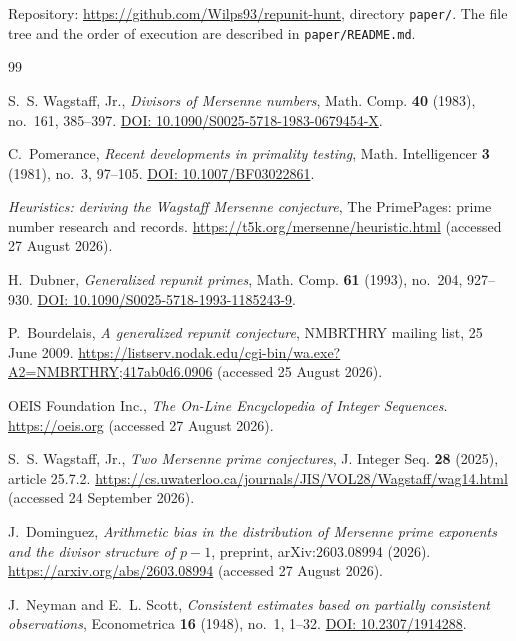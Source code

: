 \documentclass[11pt,a4paper]{article}
\theoremstyle{plain}
\theoremstyle{remark}
\begin{document}
Repository: \url{https://github.com/Wilps93/repunit-hunt}, directory
\texttt{paper/}. The file tree and the order of execution are described in
\texttt{paper/README.md}.

\begin{thebibliography}{99}

 S.~S. Wagstaff, Jr., \emph{Divisors of Mersenne
numbers}, Math. Comp. \textbf{40} (1983), no.~161, 385--397.
\href{https://doi.org/10.1090/S0025-5718-1983-0679454-X}{DOI:
10.1090/S0025-5718-1983-0679454-X}.

 C.~Pomerance, \emph{Recent developments in primality
testing}, Math. Intelligencer \textbf{3} (1981), no.~3, 97--105.
\href{https://doi.org/10.1007/BF03022861}{DOI: 10.1007/BF03022861}.

 \emph{Heuristics: deriving the Wagstaff Mersenne conjecture}, The
PrimePages: prime number research and records.
\url{https://t5k.org/mersenne/heuristic.html} (accessed 27 August 2026).

 H.~Dubner, \emph{Generalized repunit primes}, Math. Comp.
\textbf{61} (1993), no.~204, 927--930.
\href{https://doi.org/10.1090/S0025-5718-1993-1185243-9}{DOI:
10.1090/S0025-5718-1993-1185243-9}.

 P.~Bourdelais, \emph{A generalized repunit
conjecture}, NMBRTHRY mailing list, 25 June 2009.
\url{https://listserv.nodak.edu/cgi-bin/wa.exe?A2=NMBRTHRY;417ab0d6.0906}
(accessed 25 August 2026).

 OEIS Foundation Inc., \emph{The On-Line Encyclopedia of Integer
Sequences}. \url{https://oeis.org} (accessed 27 August 2026).

 S.~S. Wagstaff, Jr., \emph{Two Mersenne prime
conjectures}, J. Integer Seq. \textbf{28} (2025), article 25.7.2.
\url{https://cs.uwaterloo.ca/journals/JIS/VOL28/Wagstaff/wag14.html}
(accessed 24 September 2026).

 J.~Dominguez, \emph{Arithmetic bias in the distribution
of Mersenne prime exponents and the divisor structure of $p-1$}, preprint,
arXiv:2603.08994 (2026). \url{https://arxiv.org/abs/2603.08994}
(accessed 27 August 2026).

 J.~Neyman and E.~L. Scott, \emph{Consistent estimates
based on partially consistent observations}, Econometrica \textbf{16} (1948),
no.~1, 1--32.
\href{https://doi.org/10.2307/1914288}{DOI: 10.2307/1914288}.


\end{thebibliography}
\end{document}
